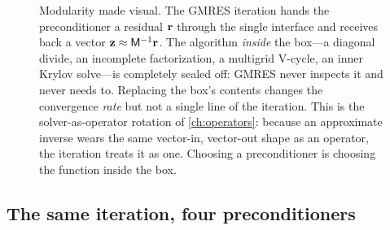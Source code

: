 \begin{figure}[t]
\centering
{}
\caption[The preconditioner as a black box GMRES cannot see inside]{Modularity made
visual. The GMRES iteration hands the preconditioner a residual $\mathbf{r}$ through the single
 interface and receives back a vector $\mathbf{z}\approx\mathsf{M}^{-1}\mathbf{r}$. The
algorithm \emph{inside} the box---a diagonal divide, an incomplete factorization, a
multigrid V-cycle, an inner Krylov solve---is completely sealed off: GMRES never inspects
it and never needs to. Replacing the box's contents changes the convergence \emph{rate}
but not a single line of the iteration. This is the solver-as-operator rotation of
\cref{ch:operators}: because an approximate inverse wears the same vector-in, vector-out
shape as an operator, the iteration treats it as one. Choosing a preconditioner is
choosing the function inside the box.}
\label{fig:blackbox-pc}
\end{figure}

\subsection{The same iteration, four preconditioners}

